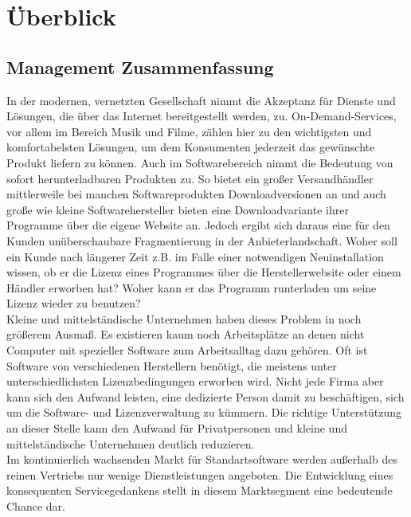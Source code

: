 \chapter{Überblick}

\section{Management Zusammenfassung}
In der modernen, vernetzten Gesellschaft nimmt die Akzeptanz für Dienste und Lösungen, die über das Internet bereitgestellt werden, zu. On-Demand-Services, vor allem im Bereich Musik und Filme, zählen hier zu den wichtigsten und komfortabelsten Lösungen, um dem Konsumenten jederzeit das gewünschte Produkt liefern zu können. Auch im Softwarebereich nimmt die Bedeutung von sofort herunterladbaren Produkten zu. So bietet ein großer Versandhändler mittlerweile bei manchen Softwareprodukten Downloadversionen an und auch große wie kleine Softwarehersteller bieten eine Downloadvariante ihrer Programme über die eigene Website an. Jedoch ergibt sich daraus eine für den Kunden unüberschaubare Fragmentierung in der Anbieterlandschaft. Woher soll ein Kunde nach längerer Zeit z.B. im Falle einer notwendigen Neuinstallation wissen, ob er die Lizenz eines Programmes über die Herstellerwebsite oder einem Händler erworben hat? Woher kann er das Programm runterladen um seine Lizenz wieder zu benutzen?\\

Kleine und mittelständische Unternehmen haben dieses Problem in noch größerem Ausmaß. Es existieren kaum noch Arbeitsplätze an denen nicht Computer mit spezieller Software zum Arbeitsalltag dazu gehören. Oft ist Software von verschiedenen Herstellern benötigt,  die meistens unter unterschiedlichsten Lizenzbedingungen erworben wird. Nicht jede Firma aber kann sich den Aufwand leisten, eine dedizierte Person damit zu beschäftigen, sich um die Software- und Lizenzverwaltung zu kümmern. Die richtige Unterstützung an dieser Stelle kann den Aufwand für Privatpersonen und kleine und mittelständische Unternehmen deutlich reduzieren.\\

Im kontinuierlich wachsenden Markt für Standartsoftware werden außerhalb des reinen Vertriebs nur wenige Dienstleistungen angeboten. Die Entwicklung eines konsequenten Servicegedankens stellt in diesem Marktsegment eine bedeutende Chance dar.

